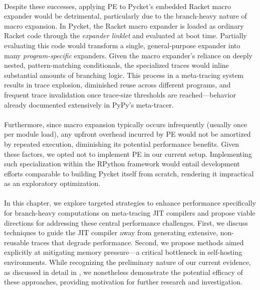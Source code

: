   \paragraph{}%
    Despite these successes, applying PE to Pycket's embedded Racket macro expander would be detrimental, particularly due to the branch-heavy nature of macro expansion. In Pycket, the Racket macro expander is loaded as ordinary Racket code through the \textit{expander linklet} and evaluated at boot time. Partially evaluating this code would transform a single, general-purpose expander into many \emph{program-specific} expanders. Given the macro expander's reliance on deeply nested, pattern-matching conditionals, the specialized traces would inline substantial amounts of branching logic. This process in a meta-tracing system results in trace explosion, diminished reuse across different programs, and frequent trace invalidation once trace-size thresholds are reached—behavior already documented extensively in PyPy’s meta-tracer.

  \paragraph{}%
    Furthermore, since macro expansion typically occurs infrequently (usually once per module load), any upfront overhead incurred by PE would not be amortized by repeated execution, diminishing its potential performance benefits. Given these factors, we opted not to implement PE in our current setup. Implementing such specialization within the RPython framework would entail development efforts comparable to building Pycket itself from scratch, rendering it impractical as an exploratory optimization.

  \paragraph{}%
    In this chapter, we explore targeted strategies to enhance performance specifically for branch-heavy computations on meta-tracing JIT compilers and propose viable directions for addressing these central performance challenges. First, we discuss techniques to guide the JIT compiler away from generating extensive, non-reusable traces that degrade performance. Second, we propose methods aimed explicitly at mitigating memory pressure—a critical bottleneck in self-hosting environments. While recognizing the preliminary nature of our current evidence, as discussed in detail in , we nonetheless demonstrate the potential efficacy of these approaches, providing motivation for further research and investigation.


